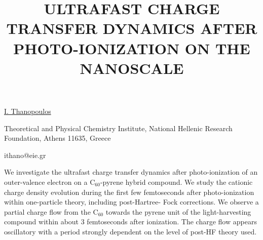 \title{ULTRAFAST CHARGE TRANSFER DYNAMICS AFTER PHOTO-IONIZATION ON THE NANOSCALE}

\underline{I. Thanopoulos} 

{\normalsize{\vspace{-4mm}
Theoretical and Physical Chemistry Institute, National Hellenic Research Foundation, Athens 11635, Greece

\email ithano@eie.gr}}

We investigate the ultrafast charge transfer dynamics after photo-ionization of an outer-valence
electron on a C$_{60}$-pyrene hybrid compound. We study the cationic charge density evolution during
the first few femtoseconds after photo-ionization within one-particle theory, including post-Hartree-
Fock corrections. We observe a partial charge flow from the C$_{60}$ towards the pyrene unit of the
light-harvesting compound within about 3 femtoseconds after ionization. The charge flow appears
oscillatory with a period strongly dependent on the level of post-HF theory used.


\vspace{\baselineskip} 